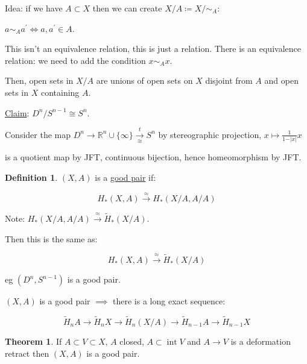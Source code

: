 \documentclass{article}
\theoremstyle{definition}
\newtheorem*{definition}{Definition}
\newtheorem{theorem}{Theorem}
\begin{document}
    Idea: if we have \(A \subset X\) then we can create \(X / A \coloneqq X / \sim_A\):

    \(a \sim_A a^{\prime} \iff a, a^{\prime} \in A\).

    This isn't an equivalence relation, this is just a relation. There is an equivalence relation: we need to add the condition \(x \sim_A x\).

    Then, open sets in \(X / A\) are unions of open sets on \(X\) disjoint from \(A\) and open sets in \(X\) containing \(A\).

    \underline{Claim}: \(D^n / S^{n-1} \cong S^n\).

    Consider the map \(D^n \to \mathbb{R}^n \cup \{ \infty \} \xrightarrow[\cong]{t} S^n\) by stereographic projection, \(x \mapsto \frac{1}{1-\vert x \vert} x\) 

    \begin{center}
    \end{center} 

    is a quotient map by JFT, continuous bijection, hence homeomorphism by JFT.

    \begin{definition}
        \((X,A)\) is a \underline{good pair} if:

        \[
            H_{\ast} (X, A) \xrightarrow{\approx} H_{\ast} (X / A, A / A)
        \]
    \end{definition}

    Note: \(H_{\ast} (X / A, A / A) \xrightarrow{\approx} \widetilde{H}_{\ast} (X / A)\).

    Then this is the same as:

    \[
        H_{\ast} (X, A) \xrightarrow{\approx} \widetilde{H}_{\ast} (X / A)
    \]

    eg \((D^n, S^{n-1})\) is a good pair.

    \((X,A)\) is a good pair \(\implies\) there is a long exact sequence:

    \[
        \widetilde{H}_n A \to \widetilde{H}_n X \to \widetilde{H}_n(X / A) \to \widetilde{H}_{n-1} A \to \widetilde{H}_{n-1} X 
    \]

    \begin{theorem}
        If \(A \subset V \subset X\), \(A\) closed, \(A \subset \operatorname{int} V\) and \(A \to V\) is a deformation retract then \((X,A)\) is a good pair.
    \end{theorem}
\end{document}
